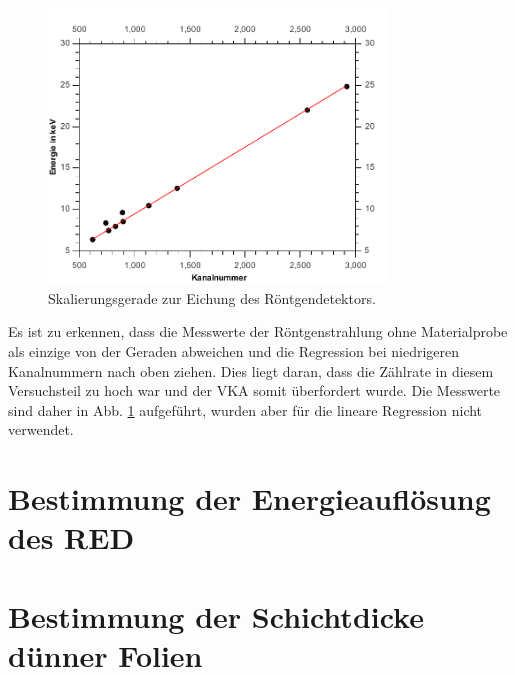 \begin{figure}[h]
	\centering\includegraphics[width=0.8\textwidth]{fig/a1_fit}
	\caption{Skalierungsgerade zur Eichung des Röntgendetektors.}
	\label{fig:a1_fit}
\end{figure}

Es ist zu erkennen, dass die Messwerte der Röntgenstrahlung ohne Materialprobe als einzige von der Geraden abweichen und die Regression bei niedrigeren Kanalnummern nach oben ziehen. Dies liegt daran, dass die Zählrate in diesem Versuchsteil zu hoch war und der VKA somit überfordert wurde. Die Messwerte sind daher in Abb. \ref{fig:a1_fit} aufgeführt, wurden aber für die lineare Regression nicht verwendet.

\section{Bestimmung der Energieauflösung des RED}

\section{Bestimmung der Schichtdicke dünner Folien}

